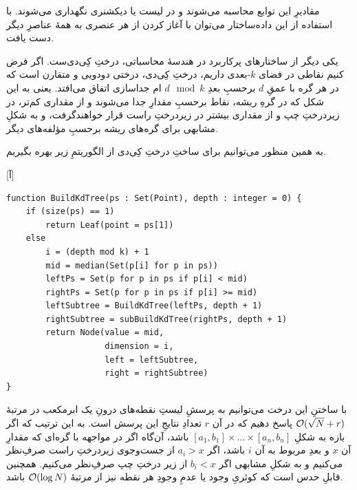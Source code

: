 مقادیرِ این توابع محاسبه می‌شوند و در لیست یا دیکشنری نگهداری می‌شوند. با استفاده از این داده‌ساختار می‌توان با آغاز کردن از هر عنصری به همهٔ عناصرِ دیگر دست یافت. 


یکی دیگر از ساختارهای پرکاربرد در هندسهٔ محاسباتی، درختِ کِی‌دی‌ست. اگر فرض کنیم نقاطی در فضای $k$-بعدی داریم، درختِ کِی‌دی، درختی دودویی و متقارن است که در هر گره با عمقِ $d$ برحسبِ بعدِ 
$d \mod k$
ام جداسازی اتفاق می‌افتد. یعنی به این شکل که در گرهِ ریشه، نقاط برحسبِ مقدارِ  جدا می‌شوند و از مقداری کم‌تر، در زیردرختِ چپ و از مقداری بیشتر در زیردرختِ راست قرار خواهندگرفت، و به شکلِ مشابهی برای گره‌های ریشه برحسبِ مؤلفه‌های دیگر.

به همین منظور می‌توانیم برای ساختِ درختِ کِی‌دی از الگوریتمِ زیر بهره بگیریم.

[آ]
\begin{latin}
\begin{lstlisting}
function BuildKdTree(ps : Set(Point), depth : integer = 0) {
    if (size(ps) == 1)
        return Leaf(point = ps[1])
    else
        i = (depth mod k) + 1 
        mid = median(Set(p[i] for p in ps))
        leftPs = Set(p for p in ps if p[i] < mid)
        rightPs = Set(p for p in ps if p[i] >= mid)
        leftSubtree = BuildKdTree(leftPs, depth + 1)
        rightSubtree = subBuildKdTree(rightPs, depth + 1)
        return Node(value = mid,
                    dimension = i, 
                    left = leftSubtree, 
                    right = rightSubtree)
}
\end{lstlisting}
\end{latin}


با ساختنِ این درخت می‌توانیم به پرسشِ لیستِ نقطه‌های درونِ یک ابرمکعب در مرتبهٔ 
$\mathcal{O}(\sqrt{N} + r)$
پاسخ دهیم که در آن $r$ تعدادِ نتایجِ این پرسش است. به این ترتیب که اگر بازه به شکلِ 
\( [a_1, b_1] \times\dots\times [a_n, b_n] \)
باشد، آن‌گاه اگر در مواجهه با گره‌ای که مقدارِ آن $x$ و بعدِ مربوط به آن $i$ باشد، اگر 
$a_i > x$
از جست‌وجوی زیردرختِ راست صرفِ‌نظر می‌کنیم و به شکلِ مشابهی اگر
$b_i < x$
از زیر درختِ چپ صرفِ‌نظر می‌کنیم.
  همچنین قابلِ حدس است که کوئریِ وجود یا عدمِ وجودِ هر نقطه نیز از مرتبهٔ
$\mathcal{O}(\log N)$
باشد.



